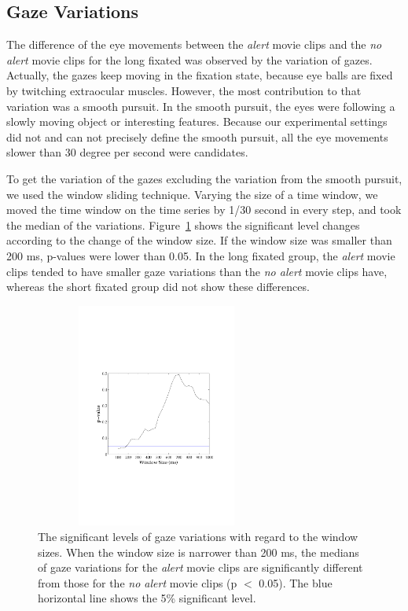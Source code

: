 \documentclass[10pt,letterpaper]{article}
\begin{document}
\subsection{Gaze Variations}
\label{subsec:gaze-variations}

The difference of the eye movements between the \textit{alert} movie clips and the \textit{no alert} movie clips for the long fixated was observed by the variation of gazes. Actually, the gazes keep moving in the fixation state, because eye balls are fixed by twitching extraocular muscles. However, the most contribution to that variation was a smooth pursuit. In the smooth pursuit, the eyes were following a slowly moving object or interesting features. Because our experimental settings did not and can not precisely define the smooth pursuit, all the eye movements slower than 30 degree per second were candidates. 

To get the variation of the gazes excluding the variation from the smooth pursuit, we used the window sliding technique. Varying the size of a time window, we moved the time window on the time series by 1/30 second in every step, and took the median of the variations. Figure~\ref{fig:gaze-variation} shows the significant level changes according to the change of the window size. If the window size was smaller than 200 ms, p-values were lower than 0.05. In the long fixated group, the \textit{alert} movie clips tended to have smaller gaze variations than the \textit{no alert} movie clips have, whereas the short fixated group did not show these differences.

\begin{figure}
  \centerline{\includegraphics[width=80mm,height=74mm,trim=26mm 75mm 26mm 76mm]{./eps/gaze_var.pdf}}
  \caption[The significant levels of gaze variations with regard to the window sizes]{The significant levels of gaze variations with regard to the window sizes. When the window size is narrower than 200 ms, the medians of gaze variations for the \textit{alert} movie clips are significantly different from those for the \textit{no alert} movie clips (p $<$ 0.05). The blue horizontal line shows the 5\% significant level.}
  \label{fig:gaze-variation}
\end{figure}
\end{document}

